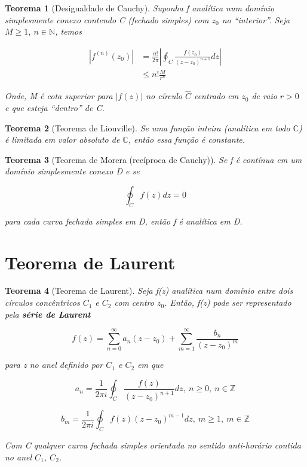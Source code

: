 \documentclass{article}
\newtheorem{theorem}{Teorema}
\begin{document}
\begin{theorem}[Desigualdade de Cauchy]
Suponha f analítica num domínio simplesmente conexo contendo C (fechado simples) com $z_0$ no ``interior''. Seja $M \geq 1,\ n \in \mathbb{N}$, temos

\begin{align*}
    \left| f^{(n)}(z_0) \right| &= \frac{n!}{2 \pi} \left| \oint_C \frac{f(z_0)}{(z - z_0)^{n+1}} d z \right| \\
    &\leq n! \frac{M}{r^n}
\end{align*}

Onde, M é cota superior para $|f(z)|$ no círculo $\hat{C}$ centrado em $z_0$ de raio $r > 0$ e que esteja ``dentro'' de C.
\end{theorem}

\begin{theorem}[Teorema de Liouville]
Se uma função inteira (analítica em todo $\mathbb{C}$) é limitada em valor absoluto de $\mathbb{C}$, então essa função é constante.
\end{theorem}

\begin{theorem}[Teorema de Morera (recíproca de Cauchy)]
Se f é contínua em um domínio simplesmente conexo D e se

$$\oint_C f(z) d z = 0$$

para cada curva fechada simples em D, então f é analítica em D.
\end{theorem}

\section*{Teorema de Laurent}
\label{s8}

\begin{theorem}[Teorema de Laurent]
Seja f(z) analítica num domínio entre dois círculos concêntricos $C_1$ e $C_2$ com centro $z_0$. Então, f(z) pode ser representado pela \textbf{série de Laurent}

$$f(z) = \sum_{n = 0}^\infty a_n (z - z_0) + \sum_{m = 1}^\infty \frac{b_n}{(z - z_0)^m}$$

para z no anel definido por $C_1$ e $C_2$ em que

$$a_n = \frac{1}{2 \pi i} \oint_C \frac{f(z)}{(z - z_0)^{n + 1}} d z,\ n \geq 0,\ n \in \mathbb{Z}$$

$$b_m = \frac{1}{2 \pi i} \oint_C f(z) (z - z_0)^{m - 1} d z,\ m \geq 1,\ m \in \mathbb{Z}$$

Com C qualquer curva fechada simples orientada no sentido anti-horário contida no anel $C_1$, $C_2$.
\end{theorem}
\end{document}
